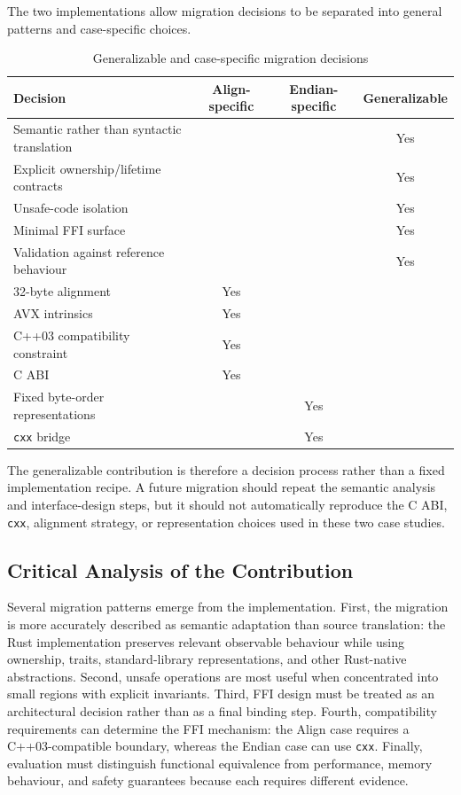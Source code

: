 The two implementations allow migration decisions to be separated into general patterns and case-specific choices.

\begin{table}[H]
\centering
\renewcommand{\arraystretch}{1.2}
\begin{tabular}{|l|c|c|c|}
\hline
\textbf{Decision} & \textbf{Align-specific} & \textbf{Endian-specific} & \textbf{Generalizable} \\ \hline
Semantic rather than syntactic translation & & & Yes \\ \hline
Explicit ownership/lifetime contracts & & & Yes \\ \hline
Unsafe-code isolation & & & Yes \\ \hline
Minimal FFI surface & & & Yes \\ \hline
Validation against reference behaviour & & & Yes \\ \hline
32-byte alignment & Yes & & \\ \hline
AVX intrinsics & Yes & & \\ \hline
C++03 compatibility constraint & Yes & & \\ \hline
C ABI & Yes & & \\ \hline
Fixed byte-order representations & & Yes & \\ \hline
\texttt{cxx} bridge & & Yes & \\ \hline
\end{tabular}
\caption{Generalizable and case-specific migration decisions}
\label{tab:migration_decision_scope}
\end{table}

The generalizable contribution is therefore a decision process rather than a fixed implementation recipe. A future migration should repeat the semantic analysis and interface-design steps, but it should not automatically reproduce the C ABI, \texttt{cxx}, alignment strategy, or representation choices used in these two case studies.

\subsection{Critical Analysis of the Contribution}
\label{sec:critical_analysis}

Several migration patterns emerge from the implementation. First, the migration is more accurately described as semantic adaptation than source translation: the Rust implementation preserves relevant observable behaviour while using ownership, traits, standard-library representations, and other Rust-native abstractions. Second, unsafe operations are most useful when concentrated into small regions with explicit invariants. Third, FFI design must be treated as an architectural decision rather than as a final binding step. Fourth, compatibility requirements can determine the FFI mechanism: the Align case requires a C++03-compatible boundary, whereas the Endian case can use \texttt{cxx}. Finally, evaluation must distinguish functional equivalence from performance, memory behaviour, and safety guarantees because each requires different evidence.

